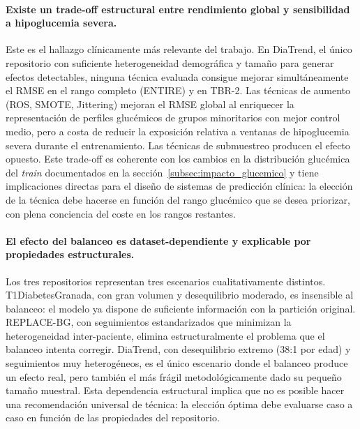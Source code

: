 \paragraph{Existe un trade-off estructural entre rendimiento global y
sensibilidad a hipoglucemia severa.}
Este es el hallazgo clínicamente más relevante del trabajo. En DiaTrend,
el único repositorio con suficiente heterogeneidad demográfica y tamaño
para generar efectos detectables, ninguna técnica evaluada consigue
mejorar simultáneamente el RMSE en el rango completo (ENTIRE) y en
TBR-2. Las técnicas de aumento (ROS, SMOTE, Jittering) mejoran el RMSE
global al enriquecer la representación de perfiles glucémicos de grupos
minoritarios con mejor control medio, pero a costa de reducir la
exposición relativa a ventanas de hipoglucemia severa durante el
entrenamiento. Las técnicas de submuestreo producen el efecto opuesto.
Este trade-off es coherente con los cambios en la distribución glucémica
del \textit{train} documentados en la sección~\ref{subsec:impacto_glucemico}
y tiene implicaciones directas para el diseño de sistemas de predicción
clínica: la elección de la técnica debe hacerse en función del rango
glucémico que se desea priorizar, con plena conciencia del coste en los
rangos restantes.

\paragraph{El efecto del balanceo es dataset-dependiente y explicable
por propiedades estructurales.}
Los tres repositorios representan tres escenarios cualitativamente
distintos. T1DiabetesGranada, con gran volumen y desequilibrio moderado,
es insensible al balanceo: el modelo ya dispone de suficiente información
con la partición original. REPLACE-BG, con seguimientos estandarizados
que minimizan la heterogeneidad inter-paciente, elimina estructuralmente
el problema que el balanceo intenta corregir. DiaTrend, con desequilibrio
extremo (38:1 por edad) y seguimientos muy heterogéneos, es el único
escenario donde el balanceo produce un efecto real, pero también el
más frágil metodológicamente dado su pequeño tamaño muestral. Esta
dependencia estructural implica que no es posible hacer una recomendación
universal de técnica: la elección óptima debe evaluarse caso a caso en
función de las propiedades del repositorio.

